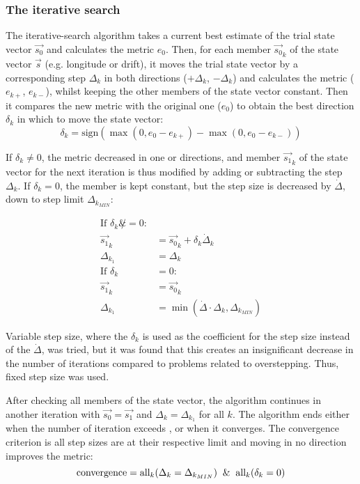 \subsubsection{The iterative search}
The iterative-search algorithm takes a current best estimate of the trial state vector $\Vec{s_0}$ and calculates the metric $e_0$. Then, for each member $\Vec{s_0}_k$ of the state vector $\Vec{s}$ (e.g. longitude or drift), it moves the trial state vector by a corresponding step $\Delta_k$ in both directions ($+\Delta_k$, $-\Delta_k$) and calculates the metric ($e_{k+}$, $e_{k-}$), whilst keeping the other members of the state vector constant. Then it compares the new metric with the original one ($e_0$) to obtain the best direction $\delta_k$ in which to move the state vector:
\begin{equation*}
    \delta_k = \text{sign}(\max(0, e_0 - e_{k+}) - \max(0, e_0 - e_{k-}))
\end{equation*}

If $\delta_k \not = 0$, the metric decreased in one or directions, and member $\Vec{s_1}_k$ of the state vector for the next iteration is thus modified by adding or subtracting the step $\Delta_k$. If $\delta_k = 0$, the member is kept constant, but the step size is decreased by $\dot\Delta$, down to step limit $\Delta_{k_{MIN}}$:

\begin{align*}
    \text{If } \delta_k \not &= 0: \\
        \Vec{s_1}_k &= \Vec{s_0}_k + \delta_k \dot \Delta_k \\
        \Delta_{k_1} &= \Delta_{k} \\
    \text{If } \delta_k &= 0: \\
        \Vec{s_1}_k &= \Vec{s_0}_k \\
        \Delta_{k_1} &= \min(\dot\Delta \cdot \Delta_k, \Delta_{k_{MIN}})
\end{align*}

Variable step size, where the $\delta_k$ is used as the coefficient for the step size instead of the $\dot\Delta$, was tried, but it was found that this creates an insignificant decrease in the number of iterations compared to problems related to overstepping. Thus, fixed step size was used.

After checking all members of the state vector, the algorithm continues in another iteration with $\Vec{s_0} = \Vec{s_1}$ and  $\Delta_k = \Delta_{k_1}$ for all $k$. The algorithm ends either when the number of iteration exceeds , or when it converges. The convergence criterion is all step sizes are at their respective limit and moving in no direction improves the metric:
\begin{equation*}
    \text{convergence} = \text{all}_k(\Delta_k = \Delta_{k_{MIN}}) \And \text{all}_k(\delta_k = 0)
\end{equation*}


